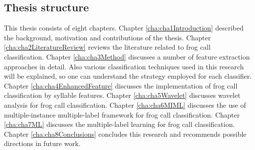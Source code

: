  
 
\subsection{Thesis structure} 
 
This thesis consists of eight chapters. Chapter \ref{cha:cha1Introduction} described the background, motivation and contributions of the thesis. Chapter \ref{cha:cha2LiteratureReview} reviews the literature related to frog call classification. Chapter \ref{cha:cha3Method} discusses a number of feature extraction approaches in detail. Also various classification techniques used in this research will be explained, so one can understand the strategy employed for each classifier. Chapter \ref{cha:cha4EnhancedFeature} discusses the implementation of frog call classification by syllable features. Chapter \ref{cha:cha5Wavelet} discusses wavelet analysis for frog call classification. Chapter \ref{cha:cha6MIML} discusses the use of multiple-instance multiple-label framework for frog call classification. Chapter \ref{cha:cha7ML} discusses the multiple-label learning for frog call classification. Chapter \ref{cha:cha8Conclusions} concludes this research and recommends possible directions in future work.

